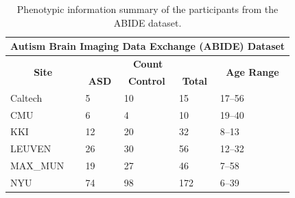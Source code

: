 \begin{table}[h!]
\begin{center}
    \caption{Phenotypic information summary of the participants from the ABIDE dataset.}
    \label{tab:4.1}
\begin{tabular}{|l|l|l|l|l|}
\hline
\multicolumn{5}{|c|}{\textbf{Autism Brain Imaging Data Exchange (ABIDE) Dataset}}                                                                                                                                                 \\ \hline
\multicolumn{1}{|c|}{\multirow{2}{*}{\textbf{Site}}} & \multicolumn{3}{c|}{\textbf{Count}}                                                                             & \multicolumn{1}{c|}{\multirow{2}{*}{\textbf{Age Range}}} \\ \cline{2-4}
\multicolumn{1}{|c|}{}                               & \multicolumn{1}{c|}{\textbf{ASD}} & \multicolumn{1}{c|}{\textbf{Control}} & \multicolumn{1}{c|}{\textbf{Total}} & \multicolumn{1}{c|}{}                                    \\ \hline
Caltech                                              & 5                                 & 10                                    & 15                                  & 17–56                                                    \\ \hline
CMU                                                  & 6                                 & 4                                     & 10                                  & 19–40                                                    \\ \hline
KKI                                                  & 12                                & 20                                    & 32                                  & 8–13                                                     \\ \hline
LEUVEN                                               & 26                                & 30                                    & 56                                  & 12–32                                                    \\ \hline
MAX\_MUN                                             & 19                                & 27                                    & 46                                  & 7–58                                                     \\ \hline
NYU                                                  & 74                                & 98                                    & 172                                 & 6–39                                                     \\ \hline

\end{tabular}
\end{center}
\end{table}
